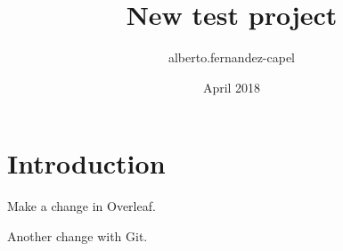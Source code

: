 \documentclass{article}
\title{New test project}
\author{alberto.fernandez-capel }
\date{April 2018}
\begin{document}
\maketitle

\section{Introduction}

Make a change in Overleaf.

Another change with Git.
\end{document}
